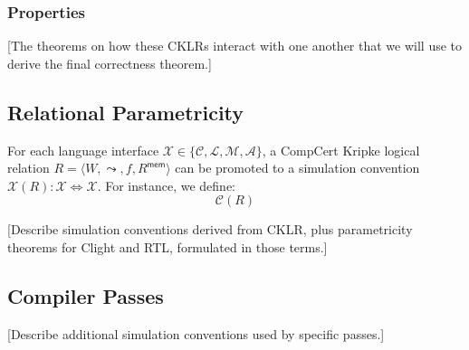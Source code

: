 \documentclass[acmsmall,timestamp,review]{acmart}
\newcommand{\kw}[1]{\ensuremath{ \mathsf{#1} }}
\begin{document}
\subsubsection{Properties}

[The theorems on how these CKLRs interact with
one another that we will use to derive the
final correctness theorem.]


\subsection{Relational Parametricity} %

For each language interface
$\mathcal{X} \in \{ \mathcal{C}, \mathcal{L}, \mathcal{M}, \mathcal{A} \}$,
a CompCert Kripke logical relation
$R = \langle W, {\leadsto}, f, R^\kw{mem} \rangle$ can be promoted to
a simulation convention
$\mathcal{X}(R) : \mathcal{X} \Leftrightarrow \mathcal{X}$.
For instance,
we define:
\[
    \mathcal{C}(R)
\]

[Describe simulation conventions derived from CKLR,
plus parametricity theorems for Clight and RTL,
formulated in those terms.]


\subsection{Compiler Passes} %

[Describe additional simulation conventions
used by specific passes.]
\end{document}
